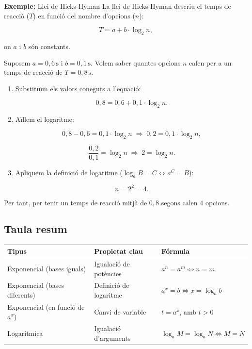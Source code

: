 \begin{exemple}{\textbf{Exemple:} Llei de Hicks-Hyman}
La llei de Hicks-Hyman descriu el temps de reacció ($T$) en funció del nombre d'opcions ($n$):

\[
T=a+b \cdot \log_2 n,
\]

on $a$ i $b$ són constants.

Suposem $a=0{,}6\,\text{s}$ i $b=0{,}1\,\text{s}$. Volem saber quantes opcions $n$ calen per a un temps de reacció de $T=0{,}8\,\text{s}$.

\begin{enumerate}
\item Substituïm els valors coneguts a l'equació:

\[
0{,}8 = 0{,}6 + 0{,}1 \cdot \log_2 n.
\]
\item Aïllem el logaritme:

\[
0{,}8 - 0{,}6 = 0{,}1 \cdot \log_2 n \;\Rightarrow\; 0{,}2 = 0{,}1 \cdot \log_2 n,
\]

\[
\frac{0{,}2}{0{,}1} = \log_2 n \;\Rightarrow\; 2 = \log_2 n.
\]
\item Apliquem la definició de logaritme ($\log_a B = C \Leftrightarrow a^C = B$):

\[
n = 2^2 = 4.
\]
\end{enumerate}

Per tant, per tenir un temps de reacció mitjà de $0{,}8$ segons calen $4$ opcions.
\end{exemple}

\subsection{Taula resum}

\begin{center}
\begin{tabular}{lll}
\toprule
\textbf{Tipus} & \textbf{Propietat clau} & \textbf{Fórmula} \\
\midrule
Exponencial (bases iguals) & Igualació de potències & $a^n=a^m \Leftrightarrow n=m$ \\
Exponencial (bases diferents) & Definició de logaritme & $a^{x}=b \Leftrightarrow x=\log_a b$ \\
Exponencial (en funció de $a^x$) & Canvi de variable & $t=a^x$, amb $t>0$ \\
Logarítmica & Igualació d'arguments & $\log_a M=\log_a N \Leftrightarrow M=N$ \\
\bottomrule
\end{tabular}
\end{center}

